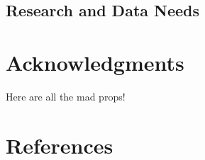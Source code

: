 \documentclass[11pt,
  english,
  a4paper,
]{article}
\begin{document}
\leavevmode\tagmcend\tagstructend


\hypertarget{research-and-data-needs-1}{%
\subsection{Research and Data Needs}\label{research-and-data-needs-1}}

\leavevmode\tagmcend\tagstructend


\hypertarget{acknowledgments}{%
\section{Acknowledgments}\label{acknowledgments}}

\leavevmode\tagmcend\tagstructend


Here are all the mad props!

\leavevmode\tagmcend\tagstructend\par

\clearpage


\hypertarget{references}{%
\section{References}\label{references}}

\leavevmode\tagmcend\tagstructend

\end{document}
